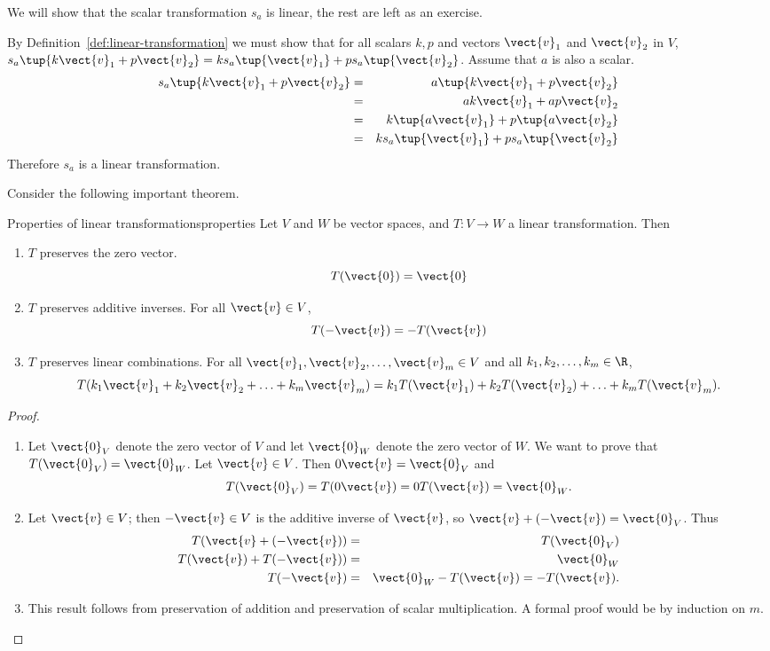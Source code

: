 \begin{solution}
We will show that the scalar transformation $s_a$ is linear, the rest are left as an exercise. 

By Definition~\ref{def:linear-transformation} we must show that for all scalars $k ,p $ and 
vectors $\vect{v}_1$ and $\vect{v}_2$ in $V$, $s_a\tup{k \vect{v}_1 + p \vect{v}_2 } = k s_a\tup{\vect{v}_1}+ p s_a\tup{\vect{v}_{2} }$. Assume that $a$ is also a scalar. 
\begin{eqnarray*}
s_a\tup{k \vect{v}_1 + p \vect{v}_2 } &=& a \tup{k \vect{v}_1 + p \vect{v}_2 } \\
&=&  ak \vect{v}_1 + ap \vect{v}_2  \\
 &=&  k \tup{a \vect{v}_1} + p\tup{a \vect{v}_2}  \\
&=& k s_a\tup{\vect{v}_1 }  + p s_a \tup{\vect{v}_2 }
\end{eqnarray*}
Therefore $s_a$ is a linear transformation.
\end{solution}

Consider the following important theorem.

\begin{theorem}{Properties of linear transformations}{properties}
Let $V$ and $W$ be vector spaces, and $T:V \to W$ a linear
transformation. 
Then
\begin{enumerate}
\item $T$ preserves the zero vector.
\[
T(\vect{0})=\vect{0}
\]
\item $T$ preserves additive inverses. 
For all $\vect{v}\in V$, 
\[
T(-\vect{v})= -T(\vect{v})
\]
\item $T$ preserves linear combinations.
For all $\vect{v}_1, \vect{v}_2, \ldots, \vect{v}_m \in V$ and
all $k_1, k_2, \ldots, k_m\in\R$,
\[ T(k_1\vect{v}_1 + k_2\vect{v}_2 + \ldots + k_m\vect{v}_m)
= k_1T(\vect{v}_1) + k_2T(\vect{v}_2) + \ldots + k_mT(\vect{v}_m).\]
\end{enumerate}
\end{theorem}

\begin{proof}
\begin{enumerate}
\item Let $\vect{0}_V$ denote the zero vector of $V$ and let
$\vect{0}_W$ denote the zero vector of $W$.
We want to prove that $T(\vect{0}_V)=\vect{0}_W$.
Let $\vect{v}\in V$. 
Then $0\vect{v}=\vect{0}_V$ and
\[ T(\vect{0}_V)=T(0\vect{v})=0T(\vect{v})=\vect{0}_W.\]
\item
Let $\vect{v}\in V$; then $-\vect{v}\in V$ is the additive
inverse of $\vect{v}$, so $\vect{v} + (-\vect{v})=\vect{0}_V$.
Thus
\begin{eqnarray*}
T(\vect{v} + (-\vect{v})) & = & T(\vect{0}_V) \\
T(\vect{v}) + T(-\vect{v})) & = & \vect{0}_W \\
T(-\vect{v}) & = & \vect{0}_W - T(\vect{v}) =  - T(\vect{v}).
\end{eqnarray*}
\item This result follows from 
preservation of addition and preservation of scalar multiplication.
A formal proof would be by induction on $m$.
\end{enumerate}
\end{proof}

